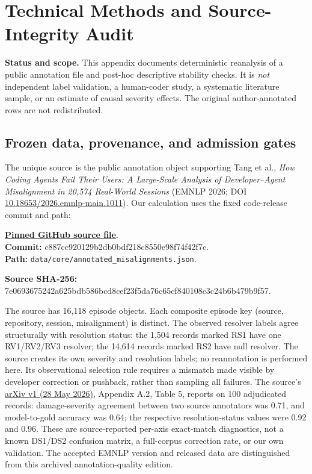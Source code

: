 \section{Technical Methods and Source-Integrity Audit}\label{app:methods}
\noindent\textbf{Status and scope.} This appendix documents deterministic reanalysis of a public annotation file and post-hoc descriptive stability checks. It is \emph{not} independent label validation, a human-coder study, a systematic literature sample, or an estimate of causal severity effects. The original author-annotated rows are not redistributed.

\subsection{Frozen data, provenance, and admission gates}\label{app:provenance}
The unique source is the public annotation object supporting Tang et al., \emph{How Coding Agents Fail Their Users: A Large-Scale Analysis of Developer--Agent Misalignment in 20,574 Real-World Sessions} (EMNLP 2026; DOI \href{https://doi.org/10.18653/2026.emnlp-main.1011}{10.18653/2026.emnlp-main.1011}). Our calculation uses the fixed code-release commit and path:
\par
\noindent\href{https://github.com/ND-SaNDwichLAB/coding-agent-misalignment/blob/c887cc920129b2db0bdf218c8550e98f74f42f7c/data/core/annotated_misalignments.json}{\textbf{Pinned GitHub source file}}.\\
\textbf{Commit:} {\small\ttfamily c887cc920129b2db0bdf218c8550e98f74f42f7c}.\\
\textbf{Path:} \texttt{data/core/annotated\_misalignments.json}.
\par
\noindent\textbf{Source SHA-256:}\\ {\small\ttfamily 7e0693675242a625bdb586bcd8cef23f5da76c65cf840108c3c24b6b479b9f57}.\par The source has 16,118 episode objects. Each composite episode key (source, repository, session, misalignment) is distinct. The observed resolver labels agree structurally with resolution status: the 1,504 records marked RS1 have one RV1/RV2/RV3 resolver; the 14,614 records marked RS2 have null resolver. The source creates its own severity and resolution labels; no reannotation is performed here. Its observational selection rule requires a mismatch made visible by developer correction or pushback, rather than sampling all failures. The source's \href{https://arxiv.org/html/2605.29442v1}{arXiv v1 (28 May 2026)}, Appendix A.2, Table 5, reports on 100 adjudicated records: damage-severity agreement between two source annotators was 0.71, and model-to-gold accuracy was 0.64; the respective resolution-status values were 0.92 and 0.96. These are source-reported per-axis exact-match diagnostics, not a known DS1/DS2 confusion matrix, a full-corpus correction rate, or our own validation. The accepted EMNLP version and released data are distinguished from this archived annotation-quality edition.

